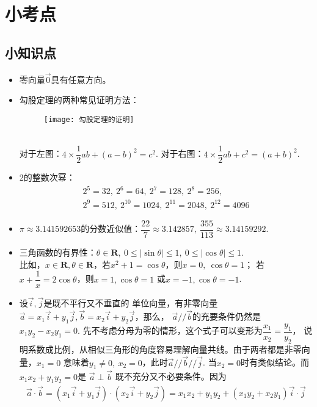\chapter{小考点}

\section{小知识点}
\begin{itemize}[leftmargin=\inteval{\myitemleftmargin}pt,itemsep=
   \inteval{\myitemitempsep}pt,topsep=\inteval{\myitemtopsep}pt]
\item  零向量$ \vec{0} $具有任意方向。

\item 勾股定理的两种常见证明方法：
\begin{figure}[htbp]
    \centering
    \texttt{[image: 勾股定理的证明]}
\end{figure}  \\
对于左图：$ 4\times \dfrac{1}{2}ab+(a-b)^2=c^2 $. \hspace{2cm} 
对于右图：$ 4\times \dfrac{1}{2}ab+c^2=(a+b)^2 $. 

\item 2的整数次幂：
\begin{gather*}
    2^5=32,\ 2^6=64,\ 2^7=128,\ 2^8=256,\\
    2^9=512,\ 2^{10}=1024,\ 2^{11}=2048,\ 2^{12}=4096
\end{gather*}

\item $ \pi\approx 3.141592653 $的分数近似值：$ \dfrac{22}{7} 
\approx 3.142857,\ \dfrac{355}{113}\approx 3.14159292 $. 

\item 三角函数的有界性：$ \theta\in\textbf{R},\ 0\leq |\sin \theta|
\leq 1,\ 0\leq |\cos \theta|\leq 1 $.\\ 比如，$ x\in \textbf{R},\theta 
\in \textbf{R} $，若$ x^2+1=\cos\theta $，则$ x=0,\ \cos\theta=1 $；
若$ x+\dfrac{1}{x}=2\cos\theta $，则$ x=1,\cos\theta=1 $
或$ x=-1,\cos\theta=-1 $. 

\item 设$ \vec{i},\vec{j} $是既不平行又不垂直的
单位向量，有非零向量$ \vec{a}=x_1\vec{i}+y_1\vec{j},
\vec{b}=x_2\vec{i}+y_2\vec{j} $，那么，
$ \vec{a}//\vec{b} $的充要条件仍然是$ x_1y_2-x_2y_1=0 $. 
先不考虑分母为零的情形，这个式子可以变形为$ \dfrac{x_1}{x_2}=\dfrac{y_1}{y_2} $，
说明系数成比例，从相似三角形的角度容易理解向量共线。由于两者都是非零向量，$ x_1=0 $
意味着$ y_1\neq 0,\ x_2=0 $，此时$ \vec{a}//\vec{b}//
\vec{j} $. 当$ x_2=0 $时有类似结论。而$ x_1x_2+y_1y_2=0 $是
$ \vec{a}\perp\vec{b} $
既不充分又不必要条件。因为
\begin{gather*}
    \vec{a}\cdot\vec{b}=(x_1\vec{i}+
    y_1\vec{j})\cdot(x_2\vec{i}+y_2\vec{j})
    =x_1x_2+y_1y_2+(x_1y_2+x_2y_1)\vec{i}\cdot \vec{j}
\end{gather*}


\end{itemize}
